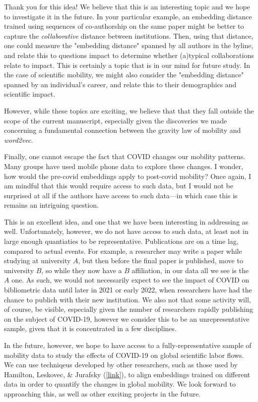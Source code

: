 \documentclass[12pt,a4paper]{article}
\newcommand{\response}[1]{{\noindent #1}}
\newcommand{\rcomment}[1]{%
\vspace{10pt}
\begin{tcolorbox}[colback=black!3,colframe=white!45!black, left=0pt, right=0pt, top=0pt, bottom=0pt, arc=0pt,outer arc=0pt, grow to left by=-0.5cm,grow to right by=-0.5cm]
#1
\end{tcolorbox}
}
\begin{document}
\response{Thank you for this idea!
We believe that this is an interesting topic and we hope to investigate it in the future. 
In your particular example, an embedding distance trained using sequences of co-authorship on the same paper might be better to capture the \textit{collaborative} distance between institutions. 
Then, using that distance, one could measure the "embedding distance" spanned by all authors in the byline, and relate this to questions impact to determine whether (a)typical collaborations relate to impact. 
This is certainly a topic that is in our mind for future study. 
In the case of scientific mobility, we might also consider the "embedding distance" spanned by an individual's career, and relate this to their demographics and scientific impact. 

However, while these topics are exciting, we believe that that they fall outside the scope of the current manuscript, especially given the discoveries we made concerning a fundamental connection between the gravity law of mobility and \textit{word2vec}.
}


\rcomment{
Finally, one cannot escape the fact that COVID changes our mobility patterns. Many groups have used mobile phone data to explore these changes. I wonder, how would the pre-covid embeddings apply to post-covid mobility? Once again, I am mindful that this would require access to such data, but I would not be surprised at all if the authors have access to such data—in which case this is remains an intriguing question.
}

\response{This is an excellent idea, and one that we have been interesting in addressing as well. 
Unfortunately, however, we do not have access to such data, at least not in large enough quantiaties to be representative. 
Publications are on a time lag, compared to actual events.
For example, a researcher may write a paper while studying at university $A$, but then before the final paper is published, move to university $B$, so while they now have a $B$ affiliation, in our data all we see is the $A$ one. 
As such, we would not necessarily expect to  see the impact of COVID on bibliometric data until later in 2021 or early 2022, when researchers have had the chance to publich with their new institution.
We also not that some activity will, of course, be visible, especially given the number of researchers rapidly publishing on the subject of COVID-19, however we consider this to be an unrepresentative sample, given that it is concentrated in a few disciplines.  

In the future, however, we hope to have access to a fully-representative sample of mobility data to study the effects of COVID-19 on global scientific labor flows. 
We can use techniqeus developed by other researchers, such as those used by Hamilton, Leskovec, \& Jurafsky (\href{https://nlp.stanford.edu/projects/histwords/}{[link]}), to align embeddings trained on different data in order to quantify the changes in global mobility. 
We look forward to approaching this, as well as other exciting projects in the future. 
}
\end{document}
